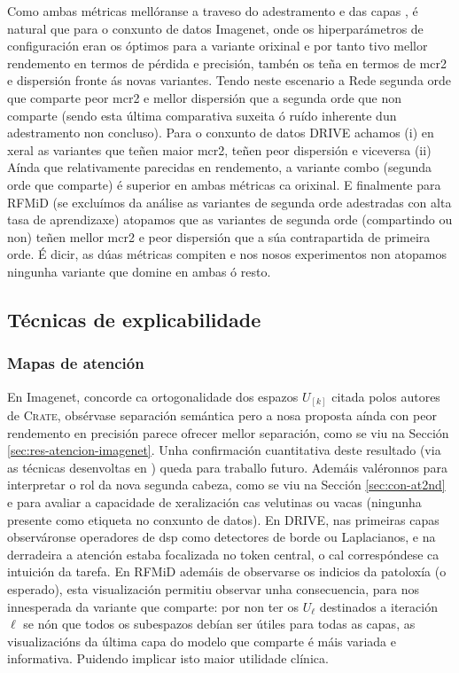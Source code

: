 Como ambas métricas mellóranse a traveso do adestramento e das capas \cite{crate}, é natural que para o conxunto de datos Imagenet, onde os hiperparámetros de configuración eran os óptimos para a variante orixinal e por tanto tivo mellor rendemento en termos de pérdida e precisión, tambén os teña en termos de \acrshort{mcr2} e dispersión fronte ás novas variantes. Tendo neste escenario a Rede segunda orde que comparte peor \acrshort{mcr2} e mellor dispersión que a segunda orde que non comparte (sendo esta última comparativa suxeita ó ruído inherente dun adestramento non concluso). Para o conxunto de datos DRIVE achamos (i) en xeral as variantes que teñen maior \acrshort{mcr2}, teñen peor dispersión e viceversa (ii) Aínda que relativamente parecidas en rendemento, a variante combo (segunda orde que comparte) é superior en ambas métricas ca orixinal. E finalmente para RFMiD (se excluímos da análise as variantes de segunda orde adestradas con alta \gls{tasa de aprendizaxe}) atopamos que as variantes de segunda orde (compartindo ou non) teñen mellor \acrshort{mcr2} e peor dispersión que a súa contrapartida de primeira orde. É dicir, as dúas métricas compiten e nos nosos experimentos non atopamos ningunha variante que domine en ambas ó resto.

\subsection{Técnicas de explicabilidade}
\subsubsection{Mapas de atención}

En Imagenet, concorde ca ortogonalidade dos espazos $U_{[k]}$ citada polos autores de \textsc{Crate}, obsérvase separación semántica pero a nosa proposta aínda con peor rendemento en precisión parece ofrecer mellor separación, como se viu na Sección \ref{sec:res-atencion-imagenet}. Unha confirmación cuantitativa deste resultado (via as técnicas desenvoltas en \cite{emergenciaSegmentacion}) queda para traballo futuro. Ademáis valéronnos para interpretar o rol da nova segunda cabeza, como se viu na Sección \ref{sec:con-at2nd} e para avaliar a capacidade de xeralización cas velutinas ou vacas (ningunha presente como etiqueta no conxunto de datos). En DRIVE, nas primeiras capas observáronse operadores de \acrshort{dsp} como detectores de borde ou Laplacianos, e na derradeira a atención estaba focalizada no \gls{token} central, o cal correspóndese ca intuición da tarefa. En RFMiD ademáis de observarse os indicios da patoloxía (o esperado), esta visualización permitiu observar unha consecuencia, para nos innesperada da variante que comparte: por non ter os $U_\ell$ destinados a iteración $\ell$ se nón que todos os subespazos debían ser útiles para todas as capas, as visualizacións da última capa do modelo que comparte é máis variada e informativa. Puidendo implicar isto maior utilidade clínica.

